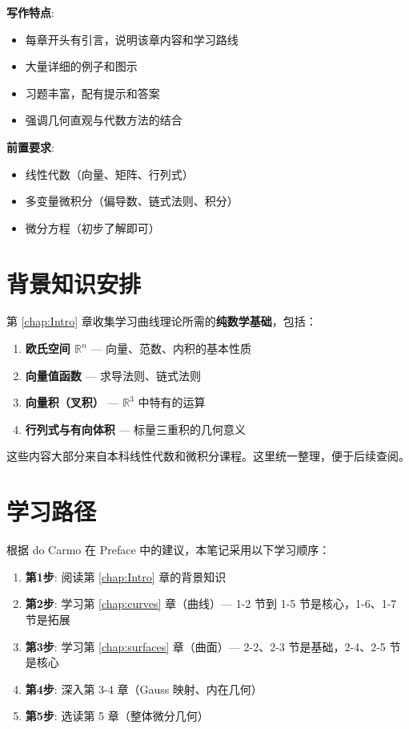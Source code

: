 \textbf{写作特点}:
\begin{itemize}
\item 每章开头有引言，说明该章内容和学习路线
\item 大量详细的例子和图示
\item 习题丰富，配有提示和答案
\item 强调几何直观与代数方法的结合
\end{itemize}

\textbf{前置要求}:
\begin{itemize}
\item 线性代数（向量、矩阵、行列式）
\item 多变量微积分（偏导数、链式法则、积分）
\item 微分方程（初步了解即可）
\end{itemize}

\section{背景知识安排}

第 \ref{chap:Intro} 章收集学习曲线理论所需的\textbf{纯数学基础}，包括：

\begin{enumerate}
\item \textbf{欧氏空间 $\mathbb{R}^n$} — 向量、范数、内积的基本性质
\item \textbf{向量值函数} — 求导法则、链式法则
\item \textbf{向量积（叉积）} — $\mathbb{R}^3$ 中特有的运算
\item \textbf{行列式与有向体积} — 标量三重积的几何意义
\end{enumerate}

这些内容大部分来自本科线性代数和微积分课程。这里统一整理，便于后续查阅。

\section{学习路径}

根据 do Carmo 在 Preface 中的建议，本笔记采用以下学习顺序：

\begin{enumerate}
\item \textbf{第1步}: 阅读第 \ref{chap:Intro} 章的背景知识
\item \textbf{第2步}: 学习第 \ref{chap:curves} 章（曲线）— 1-2 节到 1-5 节是核心，1-6、1-7 节是拓展
\item \textbf{第3步}: 学习第 \ref{chap:surfaces} 章（曲面）— 2-2、2-3 节是基础，2-4、2-5 节是核心
\item \textbf{第4步}: 深入第 3-4 章（Gauss 映射、内在几何）
\item \textbf{第5步}: 选读第 5 章（整体微分几何）
\end{enumerate}

